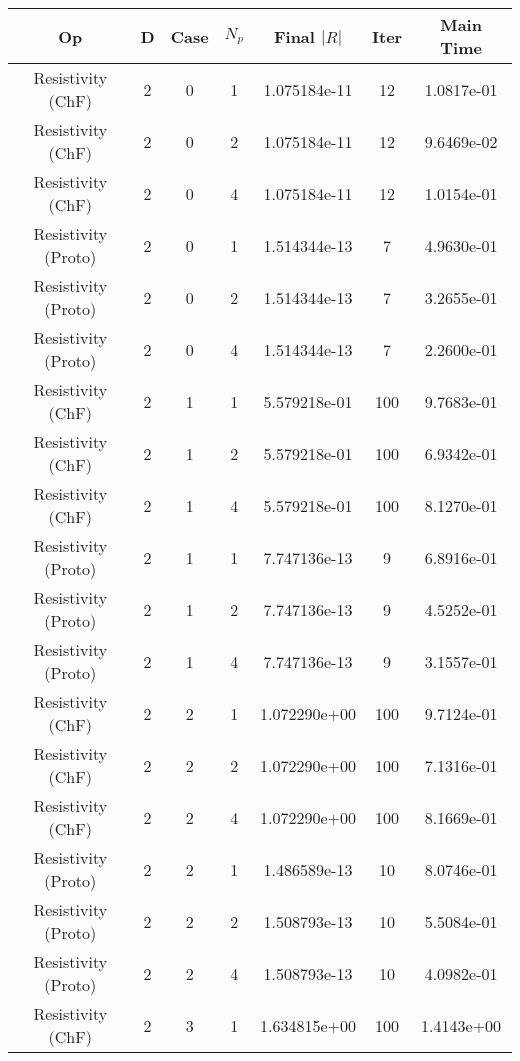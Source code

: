 \documentclass{article}
\begin{document}
\begin{small} 
  \begin{table} 
    \begin{center}
      \begin{tabular}{|c|c|c|c|c|c||c|} \hline 
Op & D & Case & $N_p$ & Final $|R|$  &  Iter & Main Time \\  
        \hline 
        Resistivity      (ChF) & 2 & 0 & 1& 1.075184e-11 & 12 & 1.0817e-01\\
        Resistivity      (ChF) & 2 & 0 & 2& 1.075184e-11 & 12 & 9.6469e-02\\
        Resistivity      (ChF) & 2 & 0 & 4& 1.075184e-11 & 12 & 1.0154e-01\\
        Resistivity    (Proto) & 2 & 0 & 1& 1.514344e-13 & 7 & 4.9630e-01\\
        Resistivity    (Proto) & 2 & 0 & 2& 1.514344e-13 & 7 & 3.2655e-01\\
        Resistivity    (Proto) & 2 & 0 & 4& 1.514344e-13 & 7 & 2.2600e-01\\
        \hline 
        Resistivity      (ChF) & 2 & 1 & 1& 5.579218e-01 & 100 & 9.7683e-01\\
        Resistivity      (ChF) & 2 & 1 & 2& 5.579218e-01 & 100 & 6.9342e-01\\
        Resistivity      (ChF) & 2 & 1 & 4& 5.579218e-01 & 100 & 8.1270e-01\\
        Resistivity    (Proto) & 2 & 1 & 1& 7.747136e-13 & 9 & 6.8916e-01\\
        Resistivity    (Proto) & 2 & 1 & 2& 7.747136e-13 & 9 & 4.5252e-01\\
        Resistivity    (Proto) & 2 & 1 & 4& 7.747136e-13 & 9 & 3.1557e-01\\
        \hline 
        Resistivity      (ChF) & 2 & 2 & 1& 1.072290e+00 & 100 & 9.7124e-01\\
        Resistivity      (ChF) & 2 & 2 & 2& 1.072290e+00 & 100 & 7.1316e-01\\
        Resistivity      (ChF) & 2 & 2 & 4& 1.072290e+00 & 100 & 8.1669e-01\\
        Resistivity    (Proto) & 2 & 2 & 1& 1.486589e-13 & 10 & 8.0746e-01\\
        Resistivity    (Proto) & 2 & 2 & 2& 1.508793e-13 & 10 & 5.5084e-01\\
        Resistivity    (Proto) & 2 & 2 & 4& 1.508793e-13 & 10 & 4.0982e-01\\
        \hline 
        Resistivity      (ChF) & 2 & 3 & 1& 1.634815e+00 & 100 & 1.4143e+00\\

\end{tabular}
\end{center}
\end{table}
\end{small}
\end{document}
